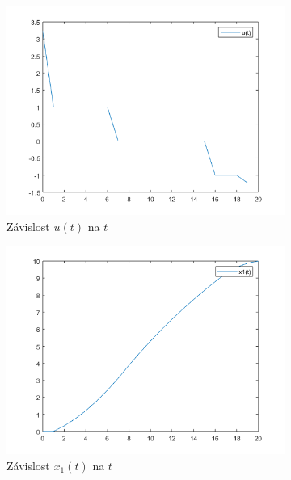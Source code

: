 \documentclass[12pt]{article}
\begin{document}
    \begin{figure}[h!]
        \centering
        \begin{subfigure}[b]{0.5\linewidth}
            \includegraphics[width=\linewidth]{ut_t.png}
            \caption{Závislost $u(t)$ na $t$}
        \end{subfigure}
        \begin{subfigure}[b]{0.5\linewidth}
            \includegraphics[width=\linewidth]{x1_t.png}
            \caption{Závislost $x_{1}(t)$ na $t$}
        \end{subfigure}
        \begin{subfigure}[b]{0.5\linewidth}

\end{subfigure}
\end{figure}
\end{document}

